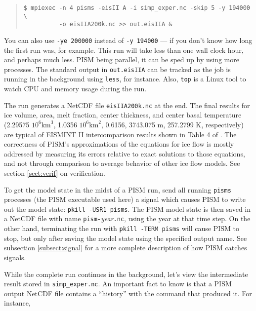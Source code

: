 \small
\begin{quote}
\begin{verbatim}
$ mpiexec -n 4 pisms -eisII A -i simp_exper.nc -skip 5 -y 194000 \
          -o eisIIA200k.nc >> out.eisIIA &
\end{verbatim}
\end{quote}\normalsize

You can also use \verb|-ye 200000| instead of \verb|-y 194000| --- if you don't know how long the first run was, for example. This run will take less than one wall clock hour, and perhaps much less.  PISM being parallel, it can be sped up by using more processes.  The standard output in \verb|out.eisIIA| can be tracked as the job is running in the background using \verb|less|, for instance.  Also, \verb|top| is a Linux tool to watch CPU and memory usage during the run.

The run generates a NetCDF file \verb|eisIIA200k.nc| at the end.  The final results for ice volume, area, melt fraction, center thickness, and center basal temperature (2.29575 $10^6 \text{km}^3$, 1.0356 $10^6 \text{km}^2$, 0.6156, 3743.075 m, 257.2799 K, respectively) are typical of EISMINT II intercomparison results shown in Table 4 of \cite{EISMINT00}.  The correctness of PISM's approximations of the equations for ice flow is mostly addressed by measuring its errors relative to exact solutions to those equations, and not through comparison to average behavior of other ice flow models.  See section \ref{sect:verif} on verification.

To get the model state in the midst of a PISM run, send all running \verb|pisms| processes (the PISM executable used here) a signal which causes PISM to write out the model state: \verb|pkill -USR1 pisms|.  The PISM model state is then saved in a NetCDF file with name \verb|pism-|\emph{year}\verb|.nc|, using the year at that time step.  On the other hand, terminating the run with \verb|pkill -TERM pisms| will cause PISM to stop, but only after saving the model state using the specified output name.  See subsection \ref{subsect:signal} for a more complete description of how PISM catches signals.

While the complete run continues in the background, let's view the intermediate result stored in \verb|simp_exper.nc|.  An important fact to know is that a PISM output NetCDF file contains a ``history'' with the command that produced it.  For instance, 

